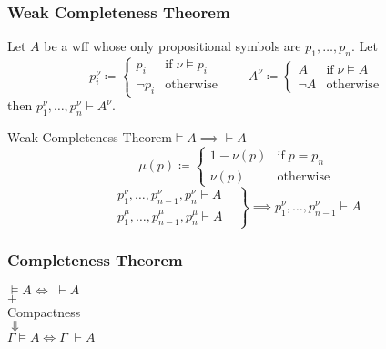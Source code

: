 \documentclass[UTF8,aspectratio=43,11pt,colorlinks,compress,openany]{beamer}%
\begin{document}
\begin{frame}\frametitle{Weak Completeness Theorem}
	\begin{lemma}
		Let $A$ be a wff whose only propositional symbols are $p_1,\dots,p_n$. Let
		\[p_i^\nu\coloneqq 
		\begin{cases}
		p_i &\text{if}\;\nu\vDash p_i\\
		\neg p_i &\text{otherwise}
		\end{cases}\qquad
		 A^\nu\coloneqq 
		\begin{cases}
		 A &\text{if}\;\nu\vDash A\\
		\neg A &\text{otherwise}
		\end{cases}\]
		then $p_1^\nu,\dots,p_n^\nu\vdash A^\nu$.
	\end{lemma}
	\begin{block}{Weak Completeness Theorem\quad $\vDash A\implies\vdash A$}
		\[\mu(p)\coloneqq 
		\begin{cases}
		1-\nu(p) &\text{if}\;p=p_n\\
		\nu(p) &\text{otherwise}
		\end{cases}
		\]
		\[
		\left.
		\begin{aligned}
		p_1^\nu,\dots,p_{n-1}^\nu,p_n^\nu\vdash A&\\
		p_1^\mu,\dots,p_{n-1}^\mu,p_n^\mu\vdash A&
		\end{aligned}\right\}\implies p_1^\nu,\dots,p_{n-1}^\nu\vdash A
		\]
	\end{block}
\end{frame}

\begin{frame}\frametitle{Completeness Theorem}
	\begin{center}
		$\vDash A\iff\;\vdash A\;\;$\\
		$+$\\
		Compactness\\
		$\Downarrow$\\
		$\Gamma\vDash A\iff\Gamma\;\vdash A$
	\end{center}
\end{frame}
\end{document}
